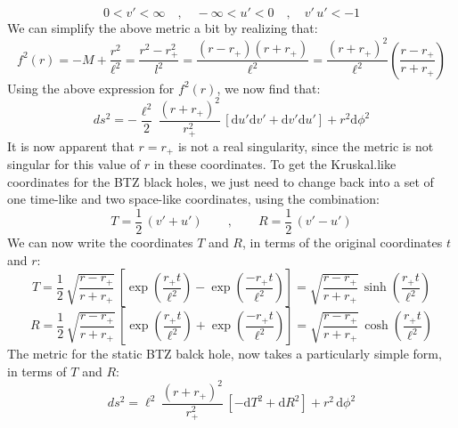 %
\begin{equation*}
0 < v' < \infty
\quad , \quad
-\infty < u' < 0
\quad , \quad
v' \, u' < -1
\end{equation*}
%
%
%
We can simplify the above metric a bit by realizing that:
%
%
\begin{equation}\label{fsimply}
f^2(r) = -M + \frac{r^2}{\ell^2}
= \frac{r^2 - r_+^2}{l^2}
= \frac{(r - r_+)(r + r_+)}{\ell^2}
= \frac{(r + r_+)^2}{\ell^2} \left( \frac{r - r_+}{r + r_+} \right)
\end{equation}
%
%
Using the above expression for $f^2(r)$, we now find that:
%
%
\begin{equation} \label{premetric}
ds^2 = - \frac{\ell^2}{2} \, \frac{(r + r_+)^2}{r_+^2} \, \left[ \mathrm{d}u' \mathrm{d}v' + \mathrm{d}v' \mathrm{d}u' \right]
+ r^2 \mathrm{d}\phi^2
\end{equation}
%
%
%
%
It is now apparent that $r = r_+$ is not a real singularity, since the metric is not singular for this value of $r$ in these coordinates. To get the Kruskal.like coordinates for the BTZ black holes, we just need to change back into a set of one time-like and two space-like coordinates, using the combination:
%
%
\begin{equation}\label{RandT}
T = \frac{1}{2} \, (v' + u') \qquad , \qquad
R = \frac{1}{2} \, (v' - u')
\end{equation}
%
%
We can now write the coordinates $T$ and $R$, in terms of the original coordinates $t$ and $r$:
%
%
\begin{equation}\label{RightT}
T = \frac{1}{2} \, \sqrt{\frac{r - r_+}{r + r_+}} \, \left[
\exp \left( \frac{r_+ t}{\ell^2}\right)
-
\exp \left( \frac{- r_+ t}{\ell^2}\right)
\right] 
= \sqrt{\frac{r - r_+}{r + r_+}} \, \sinh \left( \frac{r_+ t}{\ell^2}\right)
\end{equation}
%
%
\begin{equation}\label{RightR}
R = \frac{1}{2} \, \sqrt{\frac{r - r_+}{r + r_+}} \, \left[
\exp \left( \frac{r_+ t}{\ell^2}\right)
+
\exp \left( \frac{- r_+ t}{\ell^2}\right)
\right] 
= \sqrt{\frac{r - r_+}{r + r_+}} \, \cosh \left( \frac{r_+ t}{\ell^2}\right)
\end{equation}
%
%
The metric for the static BTZ balck hole, now takes a particularly simple form, in terms of $T$ and $R$:
%
%
\begin{equation}
ds^2 = \ell^2 \, \frac{(r + r_+)^2}{r_+^2} \, \left[
-\mathrm{d}T^2
+ \mathrm{d}R^2 \right]
+ r^2 \, \mathrm{d}\phi^2
\end{equation}
